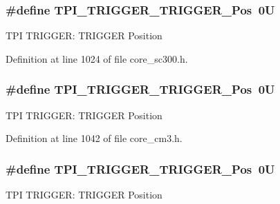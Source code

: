 \subsubsection[{\texorpdfstring{T\+P\+I\+\_\+\+T\+R\+I\+G\+G\+E\+R\+\_\+\+T\+R\+I\+G\+G\+E\+R\+\_\+\+Pos}{TPI_TRIGGER_TRIGGER_Pos}}]{\setlength{\rightskip}{0pt plus 5cm}\#define T\+P\+I\+\_\+\+T\+R\+I\+G\+G\+E\+R\+\_\+\+T\+R\+I\+G\+G\+E\+R\+\_\+\+Pos~0U}\hypertarget{group___c_m_s_i_s___t_p_i_ga5517fa2ced64efbbd413720329c50b99}{}\label{group___c_m_s_i_s___t_p_i_ga5517fa2ced64efbbd413720329c50b99}
T\+PI T\+R\+I\+G\+G\+ER\+: T\+R\+I\+G\+G\+ER Position 

Definition at line 1024 of file core\+\_\+sc300.\+h.

\subsubsection[{\texorpdfstring{T\+P\+I\+\_\+\+T\+R\+I\+G\+G\+E\+R\+\_\+\+T\+R\+I\+G\+G\+E\+R\+\_\+\+Pos}{TPI_TRIGGER_TRIGGER_Pos}}]{\setlength{\rightskip}{0pt plus 5cm}\#define T\+P\+I\+\_\+\+T\+R\+I\+G\+G\+E\+R\+\_\+\+T\+R\+I\+G\+G\+E\+R\+\_\+\+Pos~0U}\hypertarget{group___c_m_s_i_s___t_p_i_ga5517fa2ced64efbbd413720329c50b99}{}\label{group___c_m_s_i_s___t_p_i_ga5517fa2ced64efbbd413720329c50b99}
T\+PI T\+R\+I\+G\+G\+ER\+: T\+R\+I\+G\+G\+ER Position 

Definition at line 1042 of file core\+\_\+cm3.\+h.

\subsubsection[{\texorpdfstring{T\+P\+I\+\_\+\+T\+R\+I\+G\+G\+E\+R\+\_\+\+T\+R\+I\+G\+G\+E\+R\+\_\+\+Pos}{TPI_TRIGGER_TRIGGER_Pos}}]{\setlength{\rightskip}{0pt plus 5cm}\#define T\+P\+I\+\_\+\+T\+R\+I\+G\+G\+E\+R\+\_\+\+T\+R\+I\+G\+G\+E\+R\+\_\+\+Pos~0U}\hypertarget{group___c_m_s_i_s___t_p_i_ga5517fa2ced64efbbd413720329c50b99}{}\label{group___c_m_s_i_s___t_p_i_ga5517fa2ced64efbbd413720329c50b99}
T\+PI T\+R\+I\+G\+G\+ER\+: T\+R\+I\+G\+G\+ER Position 

